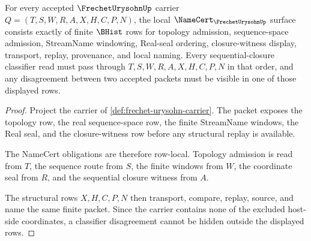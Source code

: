 \begin{theorem}
\label{thm:frechet-urysohn-namecert-obligations}
For every accepted $\FrechetUrysohnUp$ carrier $Q=(T,S,W,R,A,X,H,C,P,N)$, the local $\NameCert_{\FrechetUrysohnUp}$ surface consists exactly of finite $\BHist$ rows for topology admission, sequence-space admission, StreamName windowing, Real-seal ordering, closure-witness display, transport, replay, provenance, and local naming. Every sequential-closure classifier read must pass through $T,S,W,R,A,X,H,C,P,N$ in that order, and any disagreement between two accepted packets must be visible in one of those displayed rows.
\end{theorem}
\begin{proof}
Project the carrier of \autoref{def:frechet-urysohn-carrier}. The packet exposes the topology row, the real sequence-space row, the finite StreamName windows, the Real seal, and the closure-witness row before any structural replay is available.

The NameCert obligations are therefore row-local. Topology admission is read from $T$, the sequence route from $S$, the finite windows from $W$, the coordinate seal from $R$, and the sequential closure witness from $A$.

The structural rows $X,H,C,P,N$ then transport, compare, replay, source, and name the same finite packet. Since the carrier contains none of the excluded host-side coordinates, a classifier disagreement cannot be hidden outside the displayed rows.
\end{proof}

